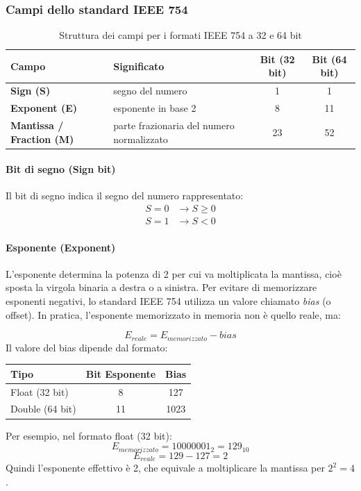 \documentclass[12pt]{article}
\begin{document}
\subsubsection{Campi dello standard IEEE 754}
\begin{table}[h!]
\centering
\resizebox{\textwidth}{!} {
  \begin{tabular}{|l|l|c|c|}
\hline
\textbf{Campo} & \textbf{Significato} & \textbf{Bit (32 bit)} & \textbf{Bit (64 bit)} \\ \hline
\textbf{Sign (S)} & segno del numero & 1 & 1 \\ \hline
\textbf{Exponent (E)} & esponente in base 2 & 8 & 11 \\ \hline
\textbf{Mantissa / Fraction (M)} & parte frazionaria del numero normalizzato & 23 & 52 \\ \hline
\end{tabular}
}
\caption{Struttura dei campi per i formati IEEE 754 a 32 e 64 bit}
\end{table}

\paragraph{Bit di segno (Sign bit)}

Il bit di segno indica il segno del numero rappresentato:
\begin{align*}
S = 0 &\rightarrow S \geq 0 \\
S = 1 &\rightarrow S < 0
\end{align*}


\paragraph{Esponente (Exponent)}
L'esponente determina la potenza di 2 per cui va moltiplicata la mantissa, cioè sposta la virgola binaria a destra o a sinistra.  
Per evitare di memorizzare esponenti negativi, lo standard IEEE 754 utilizza un valore chiamato \emph{bias} (o offset).  
In pratica, l'esponente memorizzato in memoria non è quello reale, ma:

\[
E_{reale} = E_{memorizzato} - bias
\]
Il valore del bias dipende dal formato:
\begin{center}
\begin{tabular}{|l|c|c|}
\hline
Tipo & Bit Esponente & Bias \\ \hline
Float (32 bit) & 8 & 127 \\ \hline
Double (64 bit) & 11 & 1023 \\ \hline
\end{tabular}
\end{center}
Per esempio, nel formato float (32 bit):
\[
E_{memorizzato} = 10000001_2 = 129_{10}
\]
\[
E_{reale} = 129 - 127 = 2
\]
Quindi l'esponente effettivo è 2, che equivale a moltiplicare la mantissa per \(2^2 = 4\).
\end{document}
